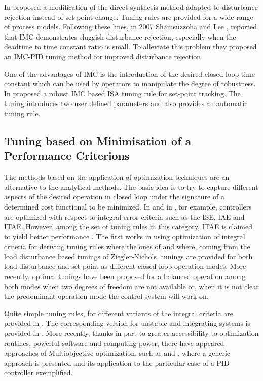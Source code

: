 In \citet{chenseborg2002} proposed a modification of the direct synthesis method adapted to disturbance rejection instead of set-point change. Tuning rules are provided for a wide range of process models. Following these lines, in 2007  Shamsuzzoha and Lee \citet{shamsu2008}, reported that IMC demonstrates sluggish disturbance rejection, especially when the deadtime to time constant ratio is small. To alleviate this problem they proposed an IMC-PID tuning method for improved disturbance rejection.

One of the advantages of IMC is the introduction of the desired closed loop time constant which can be used by operators to manipulate the degree of robustness. In \citet{vilanovaJPC2008} proposed a robust IMC based ISA tuning rule for set-point tracking. The tuning introduces two user defined parameters and also provides an automatic tuning rule.


\subsection{Tuning based on Minimisation of a Performance Criterions}

The methods based on the application of optimization techniques are an alternative to the analytical methods.
The basic idea is to try to capture different aspects of the desired operation in closed loop under the signature of a determined cost functional to be minimized. In \citet{corripio2001} and in \citet{shinskey.1994}, for example, controllers are  optimized with respect to integral error criteria such as the  ISE, IAE and ITAE.  However, among the
set of tuning rules in this category, ITAE is claimed to yield better performance \citet{ogatabook}. The first works in using optimization of integral criteria for deriving tuning rules where the ones of \citet{lopez1967} and \citet{Rovira1969a}   where, coming from the load disturbance based tunings of Ziegler-Nichols, tunings are provided for both load disturbance and set-point as different closed-loop operation modes. More recently, optimal tunings have been proposed \citep{arrieta2010} for a balanced operation among both modes when two degrees of freedom are not available or, when it is not clear the predominant operation mode the control system will work on.

Quite simple tuning rules, for different variants of the integral criteria are provided in \citet{zhuang1993} . The corresponding version for unstable and integrating systems is provided in \citet{visioli2001}. More recently, thanks in part to greater accessibility to optimization routines, powerful software and computing power, there have appeared approaches of Multiobjective optimization, such as \citet{herreros2002}  and \citet{toivonen2006}, where a generic approach is presented and its application to the particular case of a PID controller exemplified. 

